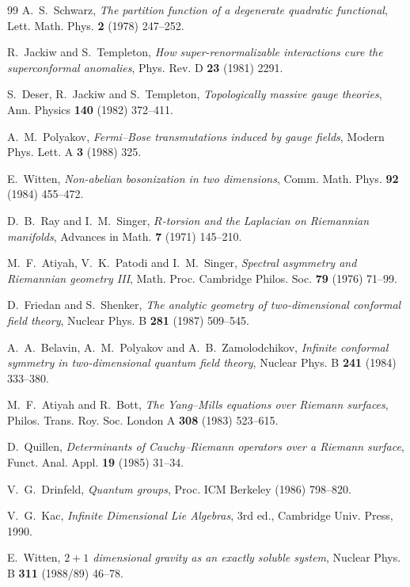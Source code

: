 \begin{thebibliography}{99}
 A.~S.~Schwarz, \emph{The partition function of a degenerate
quadratic functional}, Lett. Math. Phys. \textbf{2} (1978) 247--252.

 R.~Jackiw and S.~Templeton, \emph{How super-renormalizable interactions
cure the superconformal anomalies}, Phys. Rev. D \textbf{23} (1981) 2291.

 S.~Deser, R.~Jackiw and S.~Templeton, \emph{Topologically massive
gauge theories}, Ann. Physics \textbf{140} (1982) 372--411.

 A.~M.~Polyakov, \emph{Fermi--Bose transmutations induced by gauge
fields}, Modern Phys. Lett. A \textbf{3} (1988) 325.

 E.~Witten, \emph{Non-abelian bosonization in two dimensions},
Comm. Math. Phys. \textbf{92} (1984) 455--472.

 D.~B.~Ray and I.~M.~Singer, \emph{$R$-torsion and the Laplacian on
Riemannian manifolds}, Advances in Math. \textbf{7} (1971) 145--210.

 M.~F.~Atiyah, V.~K.~Patodi and I.~M.~Singer, \emph{Spectral asymmetry
and Riemannian geometry III}, Math. Proc. Cambridge Philos. Soc. \textbf{79} (1976) 71--99.

 D.~Friedan and S.~Shenker, \emph{The analytic geometry of two-dimensional
conformal field theory}, Nuclear Phys. B \textbf{281} (1987) 509--545.

 A.~A.~Belavin, A.~M.~Polyakov and A.~B.~Zamolodchikov,
\emph{Infinite conformal symmetry in two-dimensional quantum field theory},
Nuclear Phys. B \textbf{241} (1984) 333--380.

 M.~F.~Atiyah and R.~Bott, \emph{The Yang--Mills equations over
Riemann surfaces}, Philos. Trans. Roy. Soc. London A \textbf{308} (1983) 523--615.

 D.~Quillen, \emph{Determinants of Cauchy--Riemann operators over a
Riemann surface}, Funct. Anal. Appl. \textbf{19} (1985) 31--34.

 V.~G.~Drinfeld, \emph{Quantum groups}, Proc. ICM Berkeley (1986) 798--820.

 V.~G.~Kac, \emph{Infinite Dimensional Lie Algebras}, 3rd ed.,
Cambridge Univ. Press, 1990.

 E.~Witten, \emph{$2+1$ dimensional gravity as an exactly
soluble system}, Nuclear Phys. B \textbf{311} (1988/89) 46--78.


\end{thebibliography}

